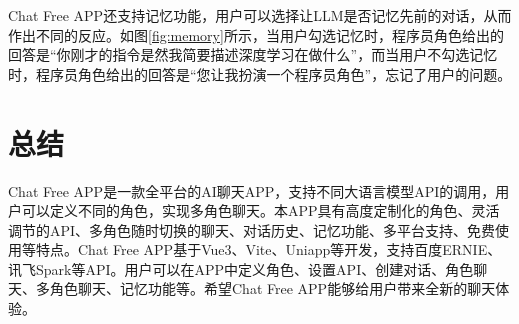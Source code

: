 \documentclass{article}
\begin{document}
Chat Free APP还支持记忆功能，用户可以选择让LLM是否记忆先前的对话，从而作出不同的反应。如图\ref{fig:memory}所示，当用户勾选记忆时，程序员角色给出的回答是“你刚才的指令是然我简要描述深度学习在做什么”，而当用户不勾选记忆时，程序员角色给出的回答是“您让我扮演一个程序员角色”，忘记了用户的问题。

\section{总结}

Chat Free APP是一款全平台的AI聊天APP，支持不同大语言模型API的调用，用户可以定义不同的角色，实现多角色聊天。本APP具有高度定制化的角色、灵活调节的API、多角色随时切换的聊天、对话历史、记忆功能、多平台支持、免费使用等特点。Chat Free APP基于Vue3、Vite、Uniapp等开发，支持百度ERNIE、讯飞Spark等API。用户可以在APP中定义角色、设置API、创建对话、角色聊天、多角色聊天、记忆功能等。希望Chat Free APP能够给用户带来全新的聊天体验。
\end{document}
